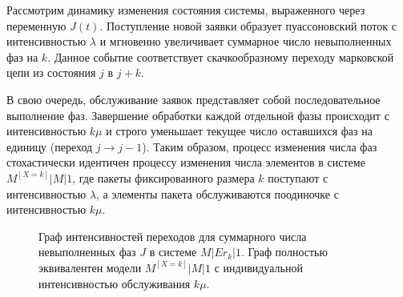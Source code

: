 \begin{sproof}
Рассмотрим динамику изменения состояния системы, выраженного через переменную $J(t)$. Поступление новой заявки образует пуассоновский поток с интенсивностью $\lambda$ и мгновенно увеличивает суммарное число невыполненных фаз на $k$. Данное событие соответствует скачкообразному переходу марковской цепи из состояния $j$ в $j + k$.

В свою очередь, обслуживание заявок представляет собой последовательное выполнение фаз. Завершение обработки каждой отдельной фазы происходит с интенсивностью $k\mu$ и строго уменьшает текущее число оставшихся фаз на единицу (переход $j \to j - 1$). Таким образом, процесс изменения числа фаз стохастически идентичен процессу изменения числа элементов в системе $M^{[X=k]}|M|1$, где пакеты фиксированного размера $k$ поступают с интенсивностью $\lambda$, а элементы пакета обслуживаются поодиночке с интенсивностью $k\mu$.
\end{sproof}

\begin{figure}[h!]
\begin{center}
\caption{Граф интенсивностей переходов для суммарного числа невыполненных фаз $J$ в системе $M|Er_k|1$. Граф полностью эквивалентен модели $M^{[X=k]}|M|1$ с индивидуальной интенсивностью обслуживания $k\mu$.}
\end{center}
\end{figure}

